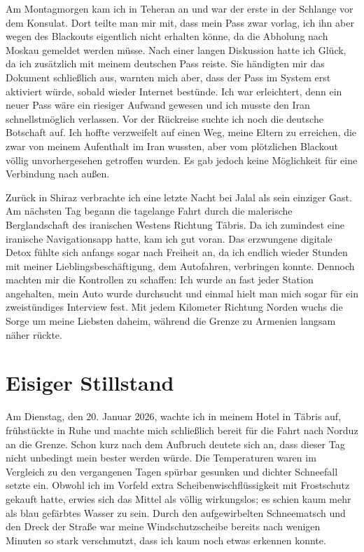 Am Montagmorgen kam ich in Teheran an und war der erste in der Schlange vor dem Konsulat. Dort teilte man mir mit, dass mein Pass zwar vorlag, ich ihn aber wegen des Blackouts eigentlich nicht erhalten könne, da die Abholung nach Moskau gemeldet werden müsse. Nach einer langen Diskussion hatte ich Glück, da ich zusätzlich mit meinem deutschen Pass reiste. Sie händigten mir das Dokument schließlich aus, warnten mich aber, dass der Pass im System erst aktiviert würde, sobald wieder Internet bestünde. Ich war erleichtert, denn ein neuer Pass wäre ein riesiger Aufwand gewesen und ich musste den Iran schnellstmöglich verlassen. Vor der Rückreise suchte ich noch die deutsche Botschaft auf. Ich hoffte verzweifelt auf einen Weg, meine Eltern zu erreichen, die zwar von meinem Aufenthalt im Iran wussten, aber vom plötzlichen Blackout völlig unvorhergesehen getroffen wurden. Es gab jedoch keine Möglichkeit für eine Verbindung nach außen.

Zurück in Shiraz verbrachte ich eine letzte Nacht bei Jalal als sein einziger Gast. Am nächsten Tag begann die tagelange Fahrt durch die malerische Berglandschaft des iranischen Westens Richtung Täbris. Da ich zumindest eine iranische Navigationsapp hatte, kam ich gut voran. Das erzwungene digitale Detox fühlte sich anfangs sogar nach Freiheit an, da ich endlich wieder Stunden mit meiner Lieblingsbeschäftigung, dem Autofahren, verbringen konnte. Dennoch machten mir die Kontrollen zu schaffen: Ich wurde an fast jeder Station angehalten, mein Auto wurde durchsucht und einmal hielt man mich sogar für ein zweistündiges Interview fest. Mit jedem Kilometer Richtung Norden wuchs die Sorge um meine Liebsten daheim, während die Grenze zu Armenien langsam näher rückte.

\chapter*{Eisiger Stillstand}

Am Dienstag, den 20. Januar 2026, wachte ich in meinem Hotel in Täbris auf, frühstückte in Ruhe und machte mich schließlich bereit für die Fahrt nach Norduz an die Grenze. Schon kurz nach dem Aufbruch deutete sich an, dass dieser Tag nicht unbedingt mein bester werden würde. Die Temperaturen waren im Vergleich zu den vergangenen Tagen spürbar gesunken und dichter Schneefall setzte ein. Obwohl ich im Vorfeld extra Scheibenwischflüssigkeit mit Frostschutz gekauft hatte, erwies sich das Mittel als völlig wirkungslos; es schien kaum mehr als blau gefärbtes Wasser zu sein. Durch den aufgewirbelten Schneematsch und den Dreck der Straße war meine Windschutzscheibe bereits nach wenigen Minuten so stark verschmutzt, dass ich kaum noch etwas erkennen konnte.


